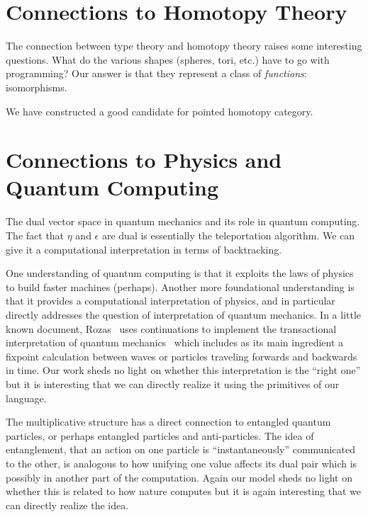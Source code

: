 \documentclass[11pt]{article}
\begin{document}
\section{Connections to Homotopy Theory} 

The connection between type theory and homotopy theory raises some
interesting questions. What do the various shapes (spheres, tori, etc.) have
to go with programming? Our answer is that they represent a class
of \emph{functions}: isomorphisms.

We have constructed a good candidate for pointed homotopy category.

\section{Connections to Physics and Quantum Computing} 

The dual vector space in quantum mechanics and its role in quantum
computing. The fact that $\eta$ and $\epsilon$ are dual is essentially the
teleportation algorithm. We can give it a computational interpretation in
terms of backtracking.

One understanding of quantum computing is that it exploits the laws of physics
to build faster machines (perhaps). Another more foundational understanding
is that it provides a computational interpretation of physics, and in
particular directly addresses the question of interpretation of quantum
mechanics. In a little known document, Rozas~\cite{Rozas:1987:CMO:889539}
uses continuations to implement the transactional interpretation of quantum
mechanics~\cite{transactional} which includes as its main ingredient a
fixpoint calculation between waves or particles traveling forwards and
backwards in time. Our work sheds no light on whether this interpretation is
the ``right one'' but it is interesting that we can directly realize it using
the primitives of our language.

The multiplicative structure has a direct connection to entangled quantum
particles, or perhaps entangled particles and anti-particles.  The idea of
entanglement, that an action on one particle is ``instantaneously''
communicated to the other, is analogous to how unifying one value affects its
dual pair which is possibly in another part of the computation.  Again our
model sheds no light on whether this is related to how nature computes but it
is again interesting that we can directly realize the idea.
\end{document}
